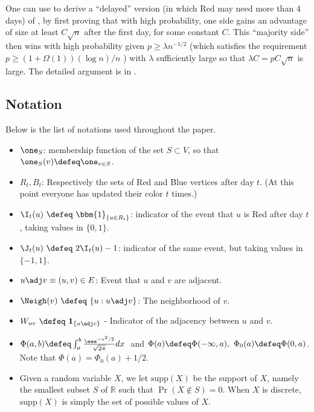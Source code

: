 \documentclass{toc}
\begin{document}
			One can use   to derive a ``delayed'' version  (in which Red may need more than 4 days) of , by first proving that with high probability, one side gains an advantage of size at least $C\sqrt{n}$ after the first day, for some constant $C$. This ``majority side'' then wins with high probability given $p \ge \lambda n^{-1/2}$ (which satisfies the requirement  %
			$p \ge (1 + \Omega(1))(\log n)/n$%
			) with $\lambda$ sufficiently large so that $\lambda C = pC\sqrt{n}$ is large. The detailed argument is in .
			
			
			\subsection {Notation}
			
			Below is the list of notations used throughout the paper.
			
			\begin{itemize}
				\item $\one_S$: membership function of the set $S\subset V$, so that $\one_S(v) \defeq \one_{v\in S}$.
				\item $R_t, B_t$: Respectively the sets of Red and Blue vertices after day $t$.
				(At this point everyone has updated their color $t$ times.)
				\item $\I_t(u) \ \defeq \ \bbm{1}_{\{u\in R_t\}}$: indicator of the event that $u$ is Red after day $t$, taking values in $\{0, 1\}$.
				\item $\J_t(u) \ \defeq \ 2\I_t(u) - 1$: indicator of the same event, but taking values in $\{-1, 1\}$.
				\item $u\adj v \equiv (u, v)\in E$: Event that $u$ and $v$ are adjacent.
				\item $\Neigh(v) \ \defeq \ \{u: u\adj v\}$: The neighborhood of $v$.
				\item $W_{uv} \ \defeq \ \mathbf{1}_{\{u\adj v\}}$ - Indicator of the adjacency between $u$ and $v$. %
				\item $\Phi(a, b) \defeq \int_a^b \frac{\eee^{-x^2/2}}{\sqrt{2\pi}}dx~$ and $\Phi(a) \defeq \Phi(-\infty, a), \ \Phi_0(a) \defeq \Phi(0, a)$.
				Note that $\Phi(a) = \Phi_0(a) + 1/2$.
				\item Given a random variable $X$, we let $\text{supp}(X)$ be the support of $X$, namely the smallest subset $S$ of $\mathbb{R}$ such that $\Pr(X\notin S) = 0$.
				When $X$ is discrete, $\text{supp}(X)$ is simply the set of possible values of $X$.
			\end{itemize}
			
\end{document}
